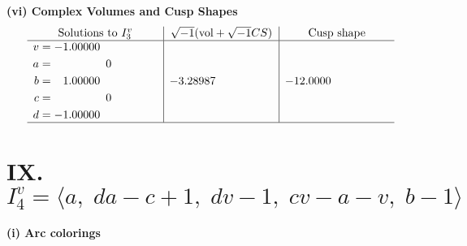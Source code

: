 \documentclass[1p]{elsarticle_modified}
\theoremstyle{definition}
\newcommand{\I}{\sqrt{-1}}
\begin{document}
\newpage\flushleft \textbf{(vi) Complex Volumes and Cusp Shapes}
$$\begin{array}{c|c|c}  
\text{Solutions to }I^v_{3}& \I (\text{vol} + \sqrt{-1}CS) & \text{Cusp shape}\\
 \hline 
\begin{aligned}
v &= -1.00000\phantom{ +0.000000I} \\
a &= \phantom{-0.000000 } 0 \\
b &= \phantom{-}1.00000\phantom{ +0.000000I} \\
c &= \phantom{-0.000000 } 0 \\
d &= -1.00000\phantom{ +0.000000I}\end{aligned}
 & -3.28987\phantom{ +0.000000I} & -12.0000\phantom{ +0.000000I}\\
 \hline 
 \end{array}$$\newpage\newpage\renewcommand{\arraystretch}{1}
\centering \section*{IX. $I^v_{4}= \langle a,\;d a- c+1,\;d v-1,\;c v- a- v,\;b-1 \rangle$}
\flushleft \textbf{(i) Arc colorings}\\
\end{document}
